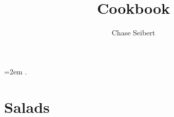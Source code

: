 \documentclass[landscape,12pt,openany]{book}
\begin{document}
\rmfamily

\title{Cookbook}
\author{Chase Seibert}
\maketitle

\columnsep=2em
\setlength{\columnseprule}{0pt}.

\setcounter{page}{0}
\cleardoublepage
\tableofcontents

\chapter{Salads}



\listoffigures
\end{document}

